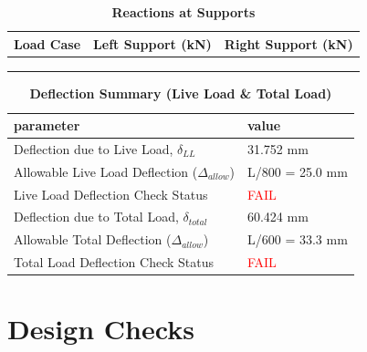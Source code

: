 \documentclass[12pt,a4paper]{report}
\numberwithin{table}{chapter}
\numberwithin{figure}{chapter}
\begin{document}
\vspace{1em}
\begin{longtable}{|>{\centering\arraybackslash}p{5.2cm}|>{\centering\arraybackslash}p{5.2cm}|>{\centering\arraybackslash}p{5.2cm}|}
\caption{\textbf{Reactions at Supports}}
\hline
\textbf{Load Case} & \textbf{Left Support (kN)} & \textbf{Right Support (kN)} \\[6pt]
\hline
 &  &  \\[6pt]
\hline
 &  &  \\[6pt]
\hline
 &  &  \\[6pt]
\hline
\end{longtable}

\vspace{1em}
\begin{longtable}{|L{7cm}|p{8.5cm}|}
\caption{\textbf{Deflection Summary (Live Load \& Total Load)}}
\hline
\textbf{parameter} & \textbf{value} \\
\hline
\textnormal{Deflection due to Live Load, $\delta_{LL}$} & 31.752 mm \\[6pt]
\hline
\textnormal{Allowable Live Load Deflection ($\Delta_{allow}$)} & L/800 = 25.0 mm \\[6pt]
\hline
\textnormal{Live Load Deflection Check Status} & \textcolor{red}{FAIL} \\[6pt]
\hline
\textnormal{Deflection due to Total Load, $\delta_{total}$} & 60.424 mm \\[6pt]
\hline
\textnormal{Allowable Total Deflection ($\Delta_{allow}$)} & L/600 = 33.3 mm \\[6pt]
\hline
\textnormal{Total Load Deflection Check Status} & \textcolor{red}{FAIL} \\[6pt]
\hline
\end{longtable}

\vspace{1em}
\noindent
\noindent{}
\noindent{}
\noindent{}


\chapter{Design Checks}
\end{document}
